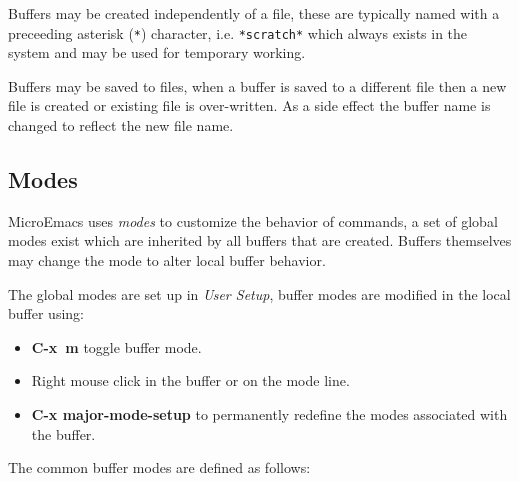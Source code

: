 \documentclass[11pt,a4paper,pdftex]{article}
\begin{document}
  Buffers may be created independently of a file, these are typically named
  with a preceeding asterisk (\texttt{*}) character, i.e. \texttt{*scratch*}
  which always exists in the system and may be used for temporary working.

  Buffers may be saved to files, when a buffer is saved to a different file
  then a new file is created or existing file is over-written. As a side
  effect the buffer name is changed to reflect the new file name.

\subsection{Modes}

  MicroEmacs uses \textit{modes} to customize the behavior of commands, a set
  of global modes exist which are inherited by all buffers that are created.
  Buffers themselves may change the mode to alter local buffer behavior.

  The global modes are set up in \textit{User Setup}, buffer modes are
  modified in the local buffer using:

  \begin{itemize}
    {\setlength{\itemsep}{0ex}}
    \item \textbf{C-x~m} toggle buffer mode.
    \item Right mouse click in the buffer or on the mode line.
    \item \textbf{C-x major-mode-setup} to permanently redefine the modes
    associated with the buffer.
  \end{itemize}

  The common buffer modes are defined as follows:
\end{document}
